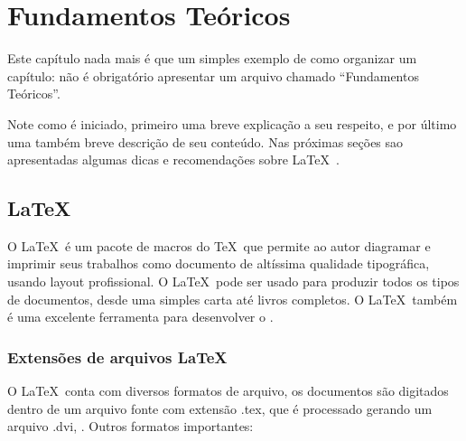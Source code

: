 \chapter{Fundamentos Teóricos}

Este capítulo nada mais é que um simples exemplo de como organizar um capítulo: não é obrigatório apresentar um arquivo chamado ``Fundamentos Teóricos''.

Note como é iniciado, primeiro uma breve explicação a seu respeito, e por último uma também breve descrição de seu conteúdo. Nas próximas seções sao apresentadas algumas dicas e recomendações sobre \LaTeX\ .

\section{\LaTeX}

O \LaTeX\ é um pacote de macros do \TeX\ que permite ao autor diagramar e imprimir seus trabalhos como documento de altíssima qualidade tipográfica, usando layout profissional.
O \LaTeX\ pode ser usado para produzir todos os tipos de documentos, desde uma simples carta até livros completos. O \LaTeX\ também é uma excelente ferramenta para desenvolver o . 

\subsection{Extensões de arquivos \LaTeX}
O \LaTeX\ conta com diversos formatos de arquivo, os documentos são digitados dentro de um arquivo fonte com extensão .tex, que é processado gerando um arquivo .dvi, . Outros formatos importantes:

